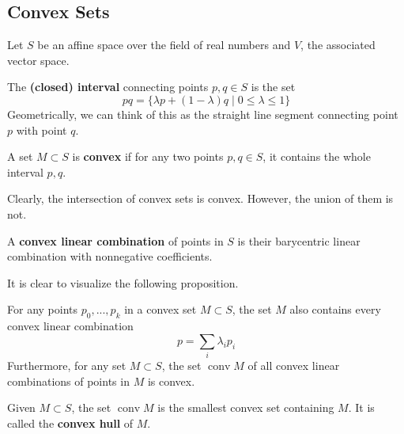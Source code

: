 \documentclass{article}
\DeclareMathOperator{\conv}{conv}
\begin{document}
  \subsection{Convex Sets}

    Let $S$ be an affine space over the field of real numbers and $V$, the associated vector space. 

    \begin{definition}
      The \textbf{(closed) interval} connecting points $p, q \in S$ is the set
      \begin{equation}
        pq = \{\lambda p + (1-\lambda) q \;|\; 0 \leq \lambda \leq 1\}
      \end{equation}
      Geometrically, we can think of this as the straight line segment connecting point $p$ with point $q$. 
    \end{definition}

    \begin{definition}
      A set $M \subset S$ is \textbf{convex} if for any two points $p, q \in S$, it contains the whole interval $p, q$. 
    \end{definition}

    Clearly, the intersection of convex sets is convex. However, the union of them is not. 

    \begin{definition}
      A \textbf{convex linear combination} of points in $S$ is their barycentric linear combination with nonnegative coefficients. 
    \end{definition}

    It is clear to visualize the following proposition. 

    \begin{proposition}
      For any points $p_0, ..., p_k$ in a convex set $M \subset S$, the set $M$ also contains every convex linear combination 
      \begin{equation}
        p = \sum_i \lambda_i p_i
      \end{equation}
      Furthermore, for any set $M \subset S$, the set $\conv{M}$ of all convex linear combinations of points in $M$ is convex. 
    \end{proposition}

    \begin{definition}
      Given $M \subset S$, the set $\conv M$ is the smallest convex set containing $M$. It is called the \textbf{convex hull} of $M$. 
    \end{definition}
\end{document}
